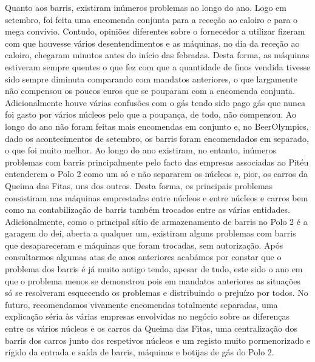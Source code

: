 Quanto aos barris, existiram inúmeros problemas ao longo do ano. Logo em setembro, foi feita uma encomenda conjunta para a receção ao caloiro e para o mega convívio. Contudo, opiniões diferentes sobre o fornecedor a utilizar fizeram com que houvesse vários desentendimentos e as máquinas, no dia da receção ao caloiro, chegaram minutos antes do início das febradas. Desta forma, as máquinas estiveram sempre quentes o que fez com que a quantidade de finos vendida tivesse sido sempre diminuta comparando com mandatos anteriores, o que largamente não compensou os poucos euros que se pouparam com a encomenda conjunta. Adicionalmente houve várias confusões com o gás tendo sido pago gás que nunca foi gasto por vários núcleos pelo que a poupança, de todo, não compensou. Ao longo do ano não foram feitas mais encomendas em conjunto e, no BeerOlympics, dado os acontecimentos de setembro, os barris foram encomendados em separado, o que foi muito melhor. Ao longo do ano existiram, no entanto, inúmeros problemas com barris principalmente pelo facto das empresas associadas ao Pitéu entenderem o Polo 2 como um só e não separarem os núcleos e, pior, os carros da Queima das Fitas, uns dos outros. Desta forma, os principais problemas consistiram nas máquinas emprestadas entre núcleos e entre núcleos e carros bem como na contabilização de barris também trocados entre as várias entidades. Adicionalmente, como o principal sítio de armazenamento de barris no Polo 2 é a garagem do \acrshort{dei}, aberta a qualquer um, existiram alguns problemas com barris que desapareceram e máquinas que foram trocadas, sem autorização. Após consultarmos algumas atas de anos anteriores acabámos por constar que o problema dos barris é já muito antigo tendo, apesar de tudo, este sido o ano em que o problema menos se demonstrou pois em mandatos anteriores as situações só se resolveram esquecendo os problemas e distribuindo o prejuízo por todos. No futuro, recomendamos vivamente encomendas totalmente separadas, uma explicação séria às várias empresas envolvidas no negócio sobre as diferenças entre os vários núcleos e os carros da Queima das Fitas, uma centralização dos barris dos carros junto dos respetivos núcleos e um registo muito pormenorizado e rígido da entrada e saída de barris, máquinas e botijas de gás do Polo 2.

